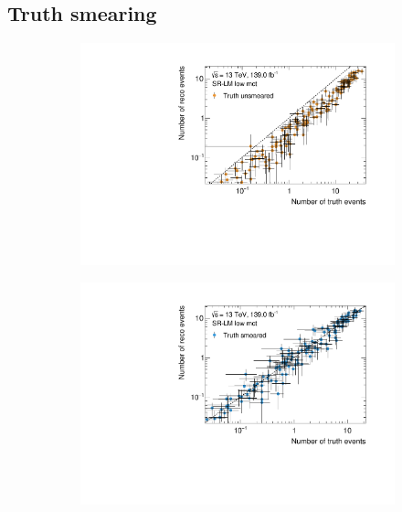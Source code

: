 
\chapter{}
\ifpdf
\graphicspath{{chapter-pmssm/Figs/Raster/}{chapter-pmssm/Figs/PDF/}{chapter-pmssm/Figs/}}
\else
\graphicspath{{chapter-pmssm/Figs/Vector/}{chapter-pmssm/Figs/}}
\fi

\section{Truth smearing}

\begin{figure}
	\centering
	\begin{subfigure}[b]{0.49\linewidth}
		\centering\includegraphics[width=\textwidth]{yields_SR-LM_low_mct_unsmeared}
	\end{subfigure}\hfill
	\begin{subfigure}[b]{0.49\linewidth}
		\centering\includegraphics[width=\textwidth]{yields_SR-LM_low_mct_smeared}

\end{subfigure}
\end{figure}
